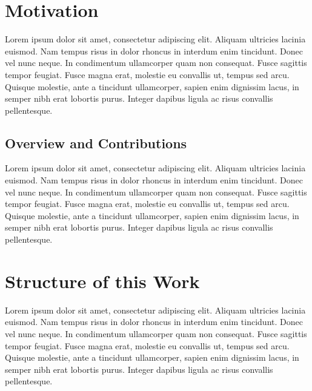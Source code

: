 
\section{Motivation}

Lorem ipsum dolor sit amet, consectetur adipiscing elit. Aliquam ultricies lacinia euismod. Nam tempus risus in dolor rhoncus in interdum enim tincidunt. Donec vel nunc neque. In condimentum ullamcorper quam non consequat. Fusce sagittis tempor feugiat. Fusce magna erat, molestie eu convallis ut, tempus sed arcu. Quisque molestie, ante a tincidunt ullamcorper, sapien enim dignissim lacus, in semper nibh erat lobortis purus. Integer dapibus ligula ac risus convallis pellentesque.

\subsection{Overview and Contributions}

Lorem ipsum dolor sit amet, consectetur adipiscing elit. Aliquam ultricies lacinia euismod. Nam tempus risus in dolor rhoncus in interdum enim tincidunt. Donec vel nunc neque. In condimentum ullamcorper quam non consequat. Fusce sagittis tempor feugiat. Fusce magna erat, molestie eu convallis ut, tempus sed arcu. Quisque molestie, ante a tincidunt ullamcorper, sapien enim dignissim lacus, in semper nibh erat lobortis purus. Integer dapibus ligula ac risus convallis pellentesque.


\section{Structure of this Work}

Lorem ipsum dolor sit amet, consectetur adipiscing elit. Aliquam ultricies lacinia euismod. Nam tempus risus in dolor rhoncus in interdum enim tincidunt. Donec vel nunc neque. In condimentum ullamcorper quam non consequat. Fusce sagittis tempor feugiat. Fusce magna erat, molestie eu convallis ut, tempus sed arcu. Quisque molestie, ante a tincidunt ullamcorper, sapien enim dignissim lacus, in semper nibh erat lobortis purus. Integer dapibus ligula ac risus convallis pellentesque.